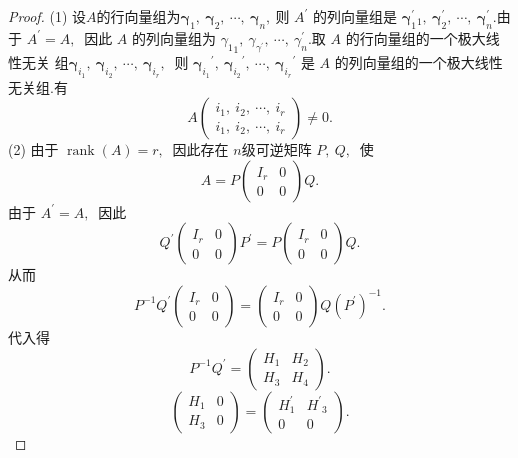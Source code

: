 \begin{proof}
	(1) 设$  A  $的行向量组为$  \boldsymbol{\gamma}_{1},\  \boldsymbol{\gamma}_{2},\  \cdots,\  \boldsymbol{\gamma}_{n} ,\  $则 $ A^{\prime} $ 的列向量组是  $\boldsymbol{\gamma}_{1}^{\prime}{ }_{1},\  \boldsymbol{\gamma}_{2}^{\prime},\  \cdots,\  \boldsymbol{\gamma}_{n}^{\prime} .$由 于 $ A^{\prime}=A ,\ $ 因此 $ A$  的列向量组为 $ {\gamma_{1}}_{1},\  \gamma_{\gamma^{\prime}},\  \cdots,\  \gamma_{n}^{\prime}.$取 $ A $ 的行向量组的一个极大线性无关 组$  \boldsymbol{\gamma}_{i_{1}},\  \boldsymbol{\gamma}_{i_{2}},\  \cdots,\  \boldsymbol{\gamma}_{i_{r}} ,\ $ 则  $\boldsymbol{\gamma}_{i_{1}}{ }^{\prime},\  \boldsymbol{\gamma}_{i_{2}}{ }^{\prime},\  \cdots,\  \boldsymbol{\gamma}_{i_{r}}{ }^{\prime} $ 是  $A $ 的列向量组的一个极大线性无关组.有
	$$A\left(\begin{array}{c}
		i_{1},\  i_{2},\  \cdots,\  i_{r} \\
		i_{1},\  i_{2},\  \cdots,\  i_{r}
	\end{array}\right) \neq 0 .$$
	(2) 由于 $ \operatorname{rank}(A)=r ,\ $ 因此存在 $ n $级可逆矩阵  $P,\  Q ,\ $ 使
	$$A=P\left(\begin{array}{ll}
		I_{r} & 0 \\
		0 & 0
	\end{array}\right) Q .$$
	由于  $A^{\prime}=A ,\ $ 因此
	$$Q^{\prime}\left(\begin{array}{cc}
		I_{r} & 0 \\
		0 & 0
	\end{array}\right) P^{\prime}=P\left(\begin{array}{cc}
		I_{r} & 0 \\
		0 & 0
	\end{array}\right) Q .$$
	从而
	$$P^{-1} Q^{\prime}\left(\begin{array}{cc}
		I_{r} & 0 \\
		0 & 0
	\end{array}\right)=\left(\begin{array}{cc}
		I_{r} & 0 \\
		0 & 0
	\end{array}\right) Q\left(P^{\prime}\right)^{-1} .$$
	代入得
	$$P^{-1} Q^{\prime}=\left(\begin{array}{ll}
		H_{1} & H_{2} \\
		H_{3} & H_{4}
	\end{array}\right) .$$
	$$ \left(\begin{array}{ll}H_{1} & 0 \\ H_{3} & 0\end{array}\right)=\left(\begin{array}{cc}H_{1}^{\prime} & H^{\prime}{ }_{3} \\ 0 & 0\end{array}\right) .$$

\end{proof}
